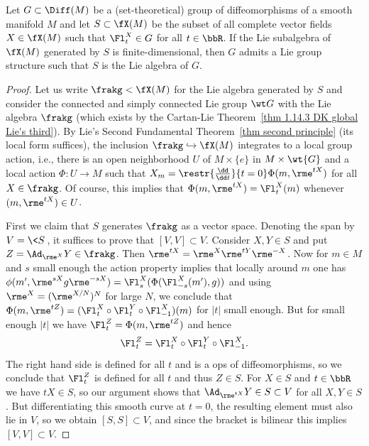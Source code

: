 \begin{cor}\label{prop 1.5.11 Cap}
    Let $G\subset \Diff(M)$ be a (set-theoretical) group of diffeomorphisms of a smooth manifold $M$ and let $S\subset \fX(M)$ be the subset of all complete vector fields $X\in\fX(M)$ such that $\Fl^X_t\in G$ for all $t\in \bbR$. If the Lie subalgebra of $\fX(M)$ generated by $S$ is finite-dimensional, then $G$ admits a Lie group structure such that $S$ is the Lie algebra of $G$.
\end{cor}
\begin{proof}
    Let us write $\frakg<\fX(M)$ for the Lie algebra generated by $S$ and consider the connected and simply connected Lie group $\wt G$ with the Lie algebra $\frakg$ (which exists by the Cartan-Lie Theorem~\ref{thm 1.14.3 DK global Lie's third}). By Lie's Second Fundamental Theorem~\ref{thm second principle} (its local form suffices), the inclusion $\frakg\hookrightarrow\fX(M)$ integrates to a local group action, i.e., there is an open neighborhood $U$ of $M\times\{e\}$ in $M\times\wt{G}$ and a local action $\Phi:U\to M$ such that $X_m=\restr{\frac{\dd}{\dd t}}{t=0}\Phi(m,\rme^{tX})$ for all $X\in\frakg$. Of course, this implies that $\Phi(m,\rme^{tX})=\Fl_t^X(m)$ whenever $(m,\rme^{tX})\in U$.

    First we claim that $S$ generates $\frakg$ as a vector space. Denoting the span by $V=\<S\>$, it suffices to prove that $[V,V]\subset V$. Consider $X,Y\in S$ and put $Z=\Ad_{\rme^{X}}Y\in\frakg$. Then $\rme^{tX}=\rme^X\rme^{tY}\rme^{-X}$. Now for $m\in M$ and $s$ small enough the action property implies that locally around $m$ one has $\phi(m',\rme^{sX}g\rme^{-sX})=\Fl_s^X(\Phi(\Fl_{-s}^X(m'),g))$ and using $\rme^X=(\rme^{X/N})^N$  for large $N$, we conclude that $\Phi(m,\rme^{tZ})=(\Fl_t^X\circ\Fl_t^Y\circ \Fl_{-1}^X)(m)$ for $|t|$ small enough. But for small enough $|t|$ we have $\Fl_t^Z=\Phi(m,\rme^{tZ})$ and hence 
    \[\Fl_t^Z=\Fl_t^X\circ \Fl_t^Y\circ \Fl_{-1}^X.\]
    The right hand side is defined for all $t$ and is a \gls{ops} of diffeomorphisms, so we conclude that $\Fl_t^Z$ is defined for all $t$ and thus $Z\in S$. For $X\in S$ and $t\in\bbR$ we have $tX\in S$, so our argument shows that $\Ad_{\rme^{tX}}Y\in S\subset V$ for all $X,Y\in S$. But differentiating this smooth curve at $t=0$, the resulting element must also lie in $V$, so we obtain $[S,S]\subset V$, and since the bracket is bilinear this implies $[V,V]\subset V$.


\end{proof}
